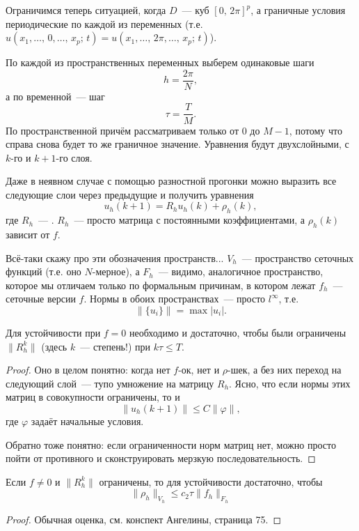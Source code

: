 \documentclass{trlnotes}
\begin{document}
Ограничимся теперь ситуацией, когда $D$~--- куб $[0, \, 2\pi]^p$, а граничные условия периодические по каждой из переменных (т.е. $u(x_1, \ldots, \, 0, \ldots, \, x_p; \, t) = u(x_1, \ldots, \, 2\pi, \ldots, \, x_p; \, t)$). 

По каждой из пространственных переменных выберем одинаковые шаги
\[
	h = \dfrac{2\pi}{N},
\] 
а по временной~--- шаг
\[
	\tau = \dfrac{T}{M}.
\]
По пространственной причём рассматриваем только от $0$ до $M-1$, потому что справа снова будет то же граничное значение. Уравнения будут двухслойными, с $k$-го и $k+1$-го слоя.

Даже в неявном случае с помощью разностной прогонки можно выразить все следующие слои через предыдущие и получить уравнения
\[
	u_h(k + 1) = R_h u_h(k) + \rho_h(k),
\]
где $R_h$~--- . $R_h$~--- просто матрица с постоянными коэффициентами, а $\rho_h(k)$ зависит от $f$.

\begin{rem}
	Всё-таки скажу про эти обозначения пространств... $V_h$~--- пространство сеточных функций  (т.е. оно $N$-мерное), а $F_h$~--- видимо, аналогичное пространство, которое мы отличаем только по формальным причинам, в котором лежат $f_h$~--- сеточные версии $f$. Нормы в обоих пространствах~--- просто $l^{\infty}$, т.е.
	\[
		\big\|\{u_i\}\big\| = \max |u_i|.
	\]
\end{rem}

\begin{thm} \label{thm:stab-1}
	Для устойчивости при $f = 0$ необходимо и достаточно, чтобы были ограничены $\|R_h^k\|$ (здесь $k$~--- степень!) при $k\tau \leqslant T$.
	\begin{proof}
		Оно в целом понятно: когда нет $f$-ок, нет и $\rho$-шек, а без них переход на следующий слой~--- тупо умножение на матрицу $R_h$. Ясно, что если нормы этих матриц в совокупности ограничены, то и
		\[
			\|u_h(k+1)\| \leqslant C \|\varphi\|,
		\]
		где $\varphi$ задаёт начальные условия.

		Обратно тоже понятно: если ограниченности норм матриц нет, можно просто пойти от противного и сконструировать мерзкую последовательность.
	\end{proof}
\end{thm}

\begin{thm}
	Если $f \neq 0$ и $\|R_h^k\|$ ограничены, то для устойчивости достаточно, чтобы
	\[
		\|\rho_h\|_{V_h} \leqslant c_2 \tau \|f_h\|_{F_h}
	\]
	\begin{proof}
		Обычная оценка, см. конспект Ангелины, страница 75.
	\end{proof}
\end{thm}
\end{document}
